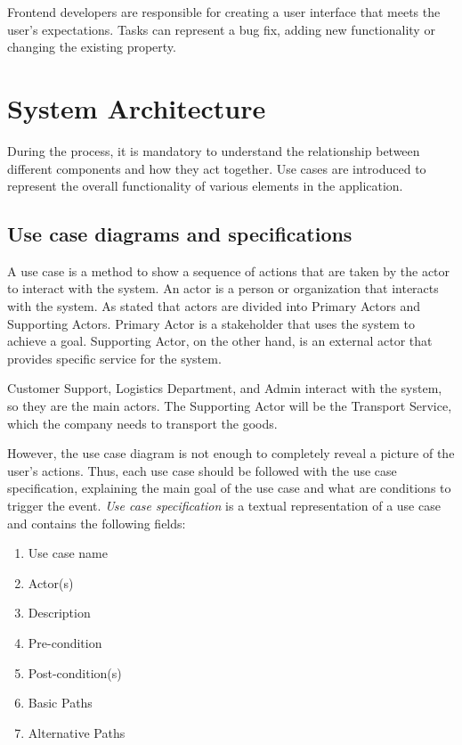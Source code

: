 \documentclass[a4paper]{article}
\begin{document}
    Frontend developers are responsible for creating a user interface that meets the user's expectations. Tasks can represent a bug fix, adding new functionality or changing the existing property.    
    
    \newpage
\section{System Architecture}
    \label{systemArchitecture}
    During the process, it is mandatory to understand the relationship between different components and how they act together. Use cases are introduced to represent the overall functionality of various elements in the application. 
    
    \subsection{Use case diagrams and specifications}
    
    A use case is a method to show a sequence of actions that are taken by the actor to interact with the system.
    An actor is a person or organization that interacts with the system. As \cite{cockburn2000writing} stated that actors are divided into Primary Actors and Supporting Actors. Primary Actor is a stakeholder that uses the system to achieve a goal. Supporting Actor, on the other hand, is an external actor that provides specific service for the system. 

    Customer Support, Logistics Department, and Admin interact with the system, so they are the main actors. The Supporting Actor will be the Transport Service, which the company needs to transport the goods. 
    
    However, the use case diagram is not enough to completely reveal a picture of the user's actions. Thus, each use case should be followed with the use case specification, explaining the main goal of the use case and what are conditions to trigger the event. \emph{Use case specification} is a textual representation of a use case and contains the following fields: 
        \begin{enumerate}
            \item Use case name
            \item Actor(s)
            \item Description
            \item Pre-condition
            \item Post-condition(s)
            \item Basic Paths
            \item Alternative Paths
        \end{enumerate}
    
\end{document}
